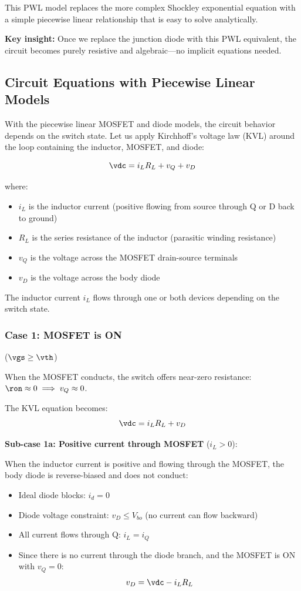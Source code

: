 This PWL model replaces the more complex Shockley exponential equation with a simple piecewise linear relationship that is easy to solve analytically.

\noindent\textbf{Key insight:} Once we replace the junction diode with this PWL equivalent, the circuit becomes purely resistive and algebraic—no implicit equations needed.

\subsection{Circuit Equations with Piecewise Linear Models}

With the piecewise linear MOSFET and diode models, the circuit behavior depends on the switch state. Let us apply Kirchhoff's voltage law (KVL) around the loop containing the inductor, MOSFET, and diode:

\[
    \vdc = i_L R_L + v_Q + v_D
\]

where:
\begin{itemize}
    \item $i_L$ is the inductor current (positive flowing from source through Q or D back to ground)
    \item $R_L$ is the series resistance of the inductor (parasitic winding resistance)
    \item $v_Q$ is the voltage across the MOSFET drain-source terminals
    \item $v_D$ is the voltage across the body diode
\end{itemize}

The inductor current $i_L$ flows through one or both devices depending on the switch state.

\subsubsection{Case 1: MOSFET is ON} ($\vgs \geq \vth$)

When the MOSFET conducts, the switch offers near-zero resistance: $\ron \approx 0 \implies v_Q \approx 0$.

The KVL equation becomes:
\[
    \vdc = i_L R_L + v_D
\]

\textbf{Sub-case 1a: Positive current through MOSFET} ($i_L > 0$):

When the inductor current is positive and flowing through the MOSFET, the body diode is reverse-biased and does not conduct:
\begin{itemize}
    \item Ideal diode blocks: $i_d = 0$
    \item Diode voltage constraint: $v_D \leq V_{bo}$ (no current can flow backward)
    \item All current flows through Q: $i_L = i_Q$
    \item Since there is no current through the diode branch, and the MOSFET is ON with $v_Q = 0$:
    \[
        v_D = \vdc - i_L R_L
    \]
\end{itemize}

